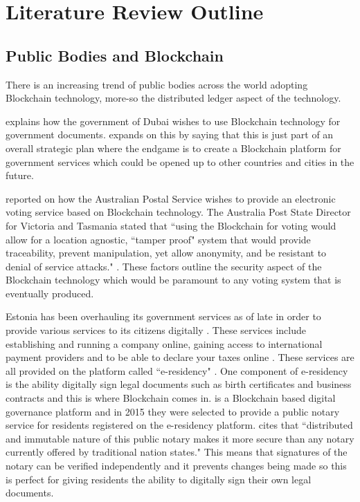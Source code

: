 \documentclass{article}
\begin{document}
\section{Literature Review Outline}

\subsection{Public Bodies and Blockchain}

There is an increasing trend of public bodies across the world adopting Blockchain technology, more-so the distributed ledger aspect of the technology.
\par
\textcite{dubaichain} explains how the government of Dubai wishes to use Blockchain technology for government documents. \textcite{dubaichain2} expands on this by saying that this is just part of an overall strategic plan where the endgame is to create a Blockchain platform for government services which could be opened up to other countries and cities in the future. 
\par
\textcite{auzchain} reported on how the Australian Postal Service wishes to provide an electronic voting service based on Blockchain technology. The Australia Post State Director for Victoria and Tasmania stated that ``using the Blockchain for voting would allow for a location agnostic, ``tamper proof" system that would provide traceability, prevent manipulation, yet allow anonymity, and be resistant to denial of service attacks." \parencite{auzchain}. These factors outline the security aspect of the Blockchain technology which would be paramount to any voting system that is eventually produced.
\par
Estonia has been overhauling its government services as of late in order to provide various services to its citizens digitally \parencite{estoniaeresidency}. These services include establishing and running a company online, gaining access to international payment providers and to be able to declare your taxes online \parencite{estoniaeresidency}. These services are all provided on the platform called ``e-residency" \parencite{estoniaeresidency}. One component of e-residency is the ability digitally sign legal documents such as birth certificates and business contracts and this is where Blockchain comes in. \textcite{estoniachain} is a Blockchain based digital governance platform and in 2015 they were selected to provide a public notary service for residents registered on the e-residency platform. \textcite{estoniachain} cites that ``distributed and immutable nature of this public notary makes it more secure than any notary currently offered by traditional nation states." This means that signatures of the notary can be verified independently and it prevents changes being made so this is perfect for giving residents the ability to digitally sign their own legal documents.
\end{document}
